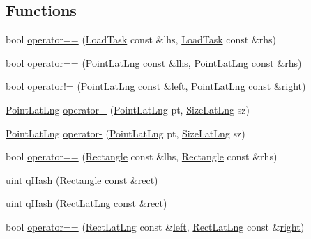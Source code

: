\subsection*{Functions}
\begin{DoxyCompactItemize}
\item 
bool \hyperlink{group___o_p_map_widget_gad390d22cc7b9cc4af3c37661d580f900}{operator==} (\hyperlink{structinternals_1_1_load_task}{Load\-Task} const \&lhs, \hyperlink{structinternals_1_1_load_task}{Load\-Task} const \&rhs)
\item 
bool \hyperlink{group___o_p_map_widget_ga07dad6b9c91069f83e0e5a90ec53af87}{operator==} (\hyperlink{structinternals_1_1_point_lat_lng}{Point\-Lat\-Lng} const \&lhs, \hyperlink{structinternals_1_1_point_lat_lng}{Point\-Lat\-Lng} const \&rhs)
\item 
bool \hyperlink{group___o_p_map_widget_ga50aa89260018f2e102183443c663b4b4}{operator!=} (\hyperlink{structinternals_1_1_point_lat_lng}{Point\-Lat\-Lng} const \&\hyperlink{glext_8h_a85b8f6c07fbc1fb5d77c2ae090f21995}{left}, \hyperlink{structinternals_1_1_point_lat_lng}{Point\-Lat\-Lng} const \&\hyperlink{glext_8h_a5ffadbbacc6b89cf6218bc43b384d3fe}{right})
\item 
\hyperlink{structinternals_1_1_point_lat_lng}{Point\-Lat\-Lng} \hyperlink{group___o_p_map_widget_ga0c71f763d92eeb6946eddcb6d939fddb}{operator+} (\hyperlink{structinternals_1_1_point_lat_lng}{Point\-Lat\-Lng} pt, \hyperlink{structinternals_1_1_size_lat_lng}{Size\-Lat\-Lng} sz)
\item 
\hyperlink{structinternals_1_1_point_lat_lng}{Point\-Lat\-Lng} \hyperlink{group___o_p_map_widget_ga6bd5d678b59611b56100b7558d386ba0}{operator-\/} (\hyperlink{structinternals_1_1_point_lat_lng}{Point\-Lat\-Lng} pt, \hyperlink{structinternals_1_1_size_lat_lng}{Size\-Lat\-Lng} sz)
\item 
bool \hyperlink{group___o_p_map_widget_ga21e50fddd3ab15ded36e81275f3cac32}{operator==} (\hyperlink{structinternals_1_1_rectangle}{Rectangle} const \&lhs, \hyperlink{structinternals_1_1_rectangle}{Rectangle} const \&rhs)
\item 
uint \hyperlink{group___o_p_map_widget_ga3b14f5cf9824e116a9b2dbd3aceaf7c3}{q\-Hash} (\hyperlink{structinternals_1_1_rectangle}{Rectangle} const \&rect)
\item 
uint \hyperlink{group___o_p_map_widget_gaa7f2cebba412ed2292d9e59299b7fd07}{q\-Hash} (\hyperlink{structinternals_1_1_rect_lat_lng}{Rect\-Lat\-Lng} const \&rect)
\item 
bool \hyperlink{group___o_p_map_widget_gae075f9b2f8b993dfd37de8f38ef1b72b}{operator==} (\hyperlink{structinternals_1_1_rect_lat_lng}{Rect\-Lat\-Lng} const \&\hyperlink{glext_8h_a85b8f6c07fbc1fb5d77c2ae090f21995}{left}, \hyperlink{structinternals_1_1_rect_lat_lng}{Rect\-Lat\-Lng} const \&\hyperlink{glext_8h_a5ffadbbacc6b89cf6218bc43b384d3fe}{right})

\end{DoxyCompactItemize}
